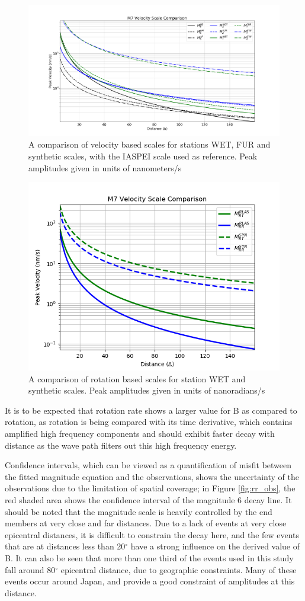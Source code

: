 \documentclass{gji}
\begin{document}
\begin{figure}
\centerline{\includegraphics[width=.5\textwidth]{scale_comparen}}
\caption{A comparison of velocity based scales for stations WET, FUR and synthetic scales, with the IASPEI scale used as reference. Peak amplitudes given in units of nanometers/s}
\label{fig:scale_comp}
\end{figure}

\begin{figure}
\centerline{\includegraphics[width=.5\textwidth]{rr_scales_compare}}
\caption{A comparison of rotation based scales for station WET and synthetic scales. Peak amplitudes given in units of nanoradians/s}
\label{fig:scale_comp}
\end{figure}

It is to be expected that rotation rate shows a larger value for B as compared to rotation, as rotation is being compared with its time derivative, which contains amplified high frequency components and should exhibit faster decay with distance as the wave path filters out this high frequency energy. 

Confidence intervals, which can be viewed as a quantification of misfit between the fitted magnitude equation and the observations, shows the uncertainty of the observations due to the limitation of spatial coverage; in Figure \ref{fig:rr_obs}, the red shaded area shows the confidence interval of the magnitude 6 decay line. %
It should be noted that the magnitude scale is heavily controlled by the end members at very close and far distances. Due to a lack of events at very close epicentral distances, it is difficult to constrain the decay here, and the few events that are at distances less than 20$^\circ$ have a strong influence on the derived value of B. It can also be seen that more than one third of the events used in this study fall around 80$^\circ$ epicentral distance, due to geographic constraints. Many of these events occur around Japan, and provide a good constraint of amplitudes at this distance.
\end{document}
